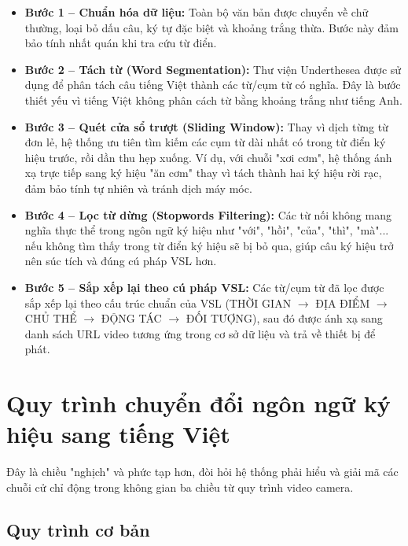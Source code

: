 \begin{itemize}
    \item \textbf{Bước 1 -- Chuẩn hóa dữ liệu:} Toàn bộ văn bản được chuyển về
    chữ thường, loại bỏ dấu câu, ký tự đặc biệt và khoảng trắng thừa. Bước này
    đảm bảo tính nhất quán khi tra cứu từ điển.

    \item \textbf{Bước 2 -- Tách từ (Word Segmentation):} Thư viện Underthesea
    được sử dụng để phân tách câu tiếng Việt thành các từ/cụm từ có nghĩa. Đây
    là bước thiết yếu vì tiếng Việt không phân cách từ bằng khoảng trắng như
    tiếng Anh.

    \item \textbf{Bước 3 -- Quét cửa sổ trượt (Sliding Window):} Thay vì dịch
    từng từ đơn lẻ, hệ thống ưu tiên tìm kiếm các cụm từ dài nhất có trong từ
    điển ký hiệu trước, rồi dần thu hẹp xuống. Ví dụ, với chuỗi "xơi cơm", hệ
    thống ánh xạ trực tiếp sang ký hiệu "ăn cơm" thay vì tách thành hai ký hiệu
    rời rạc, đảm bảo tính tự nhiên và tránh dịch máy móc.

    \item \textbf{Bước 4 -- Lọc từ dừng (Stopwords Filtering):} Các từ nối không
    mang nghĩa thực thể trong ngôn ngữ ký hiệu như "với", "hồi", "của", "thì",
    "mà"... nếu không tìm thấy trong từ điển ký hiệu sẽ bị bỏ qua, giúp câu ký
    hiệu trở nên súc tích và đúng cú pháp VSL hơn.

    \item \textbf{Bước 5 -- Sắp xếp lại theo cú pháp VSL:} Các từ/cụm từ đã lọc
    được sắp xếp lại theo cấu trúc chuẩn của VSL (THỜI GIAN $\rightarrow$ ĐỊA
    ĐIỂM $\rightarrow$ CHỦ THỂ $\rightarrow$ ĐỘNG TÁC $\rightarrow$ ĐỐI TƯỢNG),
    sau đó được ánh xạ sang danh sách URL video tương ứng trong cơ sở dữ liệu và
    trả về thiết bị để phát.
\end{itemize}

\section{Quy trình chuyển đổi ngôn ngữ ký hiệu sang tiếng Việt}

Đây là chiều "nghịch" và phức tạp hơn, đòi hỏi hệ thống phải hiểu và giải mã
các chuỗi cử chỉ động trong không gian ba chiều từ quy trình video camera.

\subsection{Quy trình cơ bản}

